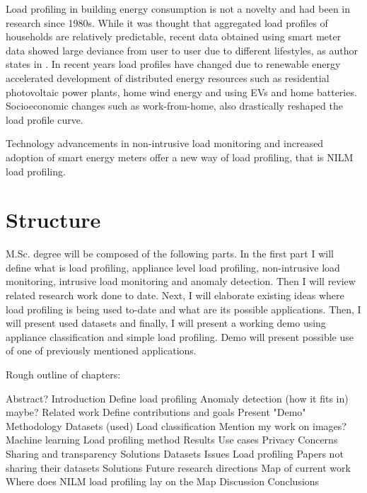 \documentclass[
11pt, %
english, %
singlespacing, %
headsepline, %
]{MastersDoctoralThesis} %
\begin{document}

Load profiling in building energy consumption is not a novelty and had been in research since 1980s.
While it was thought that aggregated load profiles of households are relatively predictable, recent data obtained using smart meter data showed large deviance from user to user due to different lifestyles, as author states in \cite{Review2021}.
In recent years load profiles have changed due to renewable energy accelerated development of distributed energy resources such as residential photovoltaic
power plants, home wind energy and using EVs and home batteries. Socioeconomic changes such as work-from-home, also drastically reshaped the load profile curve. 


Technology advancements in non-intrusive load monitoring and increased adoption of smart energy meters offer a new
way of load profiling, that is NILM load profiling.

\section{Structure}
M.Sc. degree will be composed of the following parts. In the first part I will define what is load profiling, appliance level load profiling, 
non-intrusive load monitoring, intrusive load monitoring and anomaly detection. Then I will review related research work done to date. Next, I will elaborate 
existing ideas where load profiling is being used to-date and what are its possible applications. Then, I will present used datasets and finally,
I will present a working demo using appliance classification and simple load profiling.
Demo will present possible use of one of previously mentioned applications. 

Rough outline of chapters: 
\begin{outline}
	\1 Abstract?
	\1 Introduction
	\1 Define load profiling
	\1 Anomaly detection (how it fits in) maybe?
	\1 Related work
	\1 Define contributions and goals
	\1 Present "Demo"
	\1 Methodology
	\2 Datasets (used)
	\2 Load classification
	\3 Mention my work on images?
	\3 Machine learning
	\2 Load profiling method
	\1 Results
	\1 Use cases
	\1 Privacy
	\1 Concerns
	\1 Sharing and transparency
	\1 Solutions
	\1 Datasets
	\2 Issues 
	\2 Load profiling
	\2 Papers not sharing their datasets
	\2 Solutions
	\1 Future research directions
	\2 Map of current work
	\2 Where does NILM load profiling lay on the Map
	\1 Discussion
	\1 Conclusions
	
	\end{outline}
\end{document}
